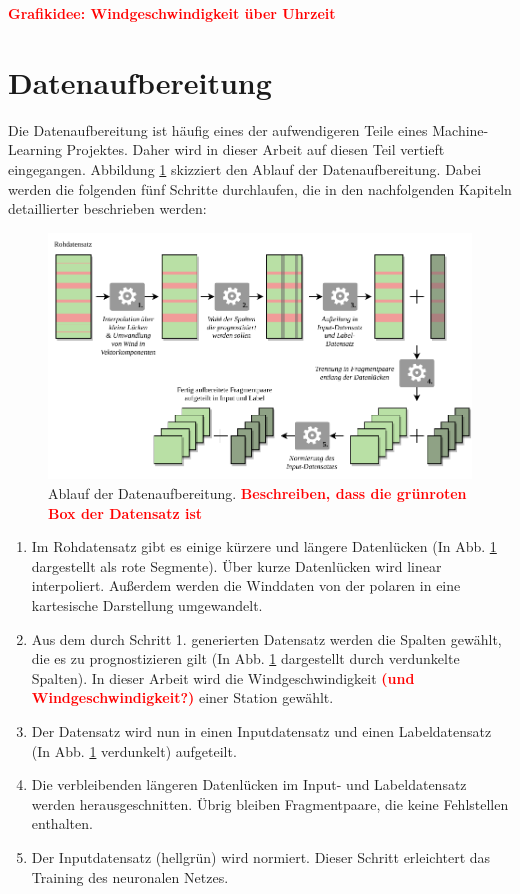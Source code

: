 \documentclass[
12pt, %
toc=listofnumbered, %
toc=chapterentrydotfill, %
numbers=noenddot, %
captions=tableheading, %
bibliography=numbered
]{scrreprt}
\let\Oldsection\section
\renewcommand{\section}{\FloatBarrier\Oldsection}
\newcommand{\qm}[1]{\glqq#1\grqq{}} %
\newcommand{\highlight}[1]{\textbf{\textcolor{red}{#1}}}
\begin{document}
\highlight{Grafikidee: Windgeschwindigkeit über Uhrzeit}

\section{Datenaufbereitung}\label{section:Datenaufbereitung}
Die Datenaufbereitung ist häufig eines der aufwendigeren Teile eines Machine-Learning Projektes. Daher wird in dieser Arbeit auf diesen Teil vertieft eingegangen. Abbildung \ref{fig:preprocessing} skizziert den Ablauf der Datenaufbereitung. Dabei werden die folgenden fünf Schritte durchlaufen, die in den nachfolgenden Kapiteln detaillierter beschrieben werden:

\begin{figure}[tph]
	\begin{center}
		\includegraphics[]{./images/preprocessing.pdf}
		\caption{Ablauf der Datenaufbereitung. \highlight{Beschreiben, dass die grünroten Box der Datensatz ist}}
		\label{fig:preprocessing}
	\end{center}
\end{figure}

\begin{enumerate}
	\item Im Rohdatensatz gibt es einige kürzere und längere Datenlücken (In Abb. \ref{fig:preprocessing} dargestellt als rote Segmente). Über kurze Datenlücken wird linear interpoliert. Außerdem werden die Winddaten von der polaren in eine kartesische Darstellung umgewandelt.
	\item Aus dem durch Schritt 1. generierten Datensatz werden die Spalten gewählt, die es zu prognostizieren gilt (In Abb. \ref{fig:preprocessing} dargestellt durch verdunkelte Spalten). In dieser Arbeit wird die Windgeschwindigkeit \highlight{(und Windgeschwindigkeit?)} einer Station gewählt.
	\item Der Datensatz wird nun in einen Inputdatensatz und einen Labeldatensatz (In Abb. \ref{fig:preprocessing} verdunkelt) aufgeteilt.
	\item Die verbleibenden längeren Datenlücken im Input- und Labeldatensatz werden \qm{herausgeschnitten}. Übrig bleiben Fragmentpaare, die keine Fehlstellen enthalten.
	\item Der Inputdatensatz (hellgrün) wird normiert. Dieser Schritt erleichtert das Training des neuronalen Netzes.
\end{enumerate}
\end{document}
